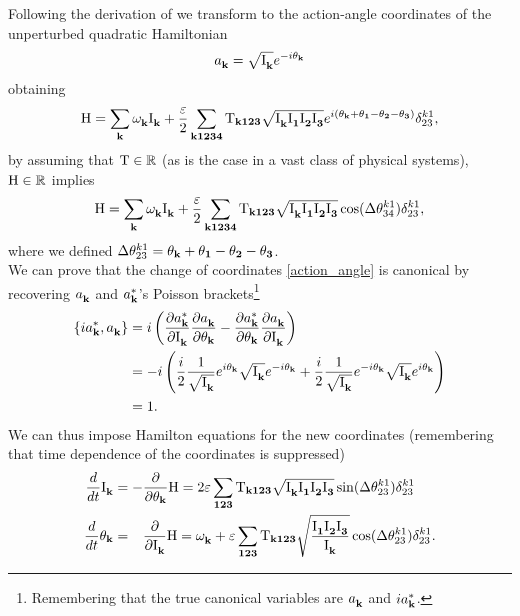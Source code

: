 Following the derivation of \cite{Onorato2020} we transform to the action-angle coordinates of the unperturbed quadratic Hamiltonian
\begin{equation}
    a_\mathbf{k}^{} = \sqrt{\mathrm{I}^{}_\mathbf{k}}e^{-i\theta_\mathbf{k}}
    \label{action_angle}
\end{equation} 
obtaining 
\begin{equation}
    \mathrm{H} = \sum_\mathbf{k} \omega^{}_{\mathbf{k}} \mathrm{I}^{}_\mathbf{k} + \frac{\varepsilon}{2} 
    \sum_{\mathbf{k1234}}\mathrm{T}_{\mathbf{k123}}\sqrt{\mathrm{I}^{}_\mathbf{k}\mathrm{I}^{}_\mathbf{1}\mathrm{I}^{}_\mathbf{2}\mathrm{I}^{}_\mathbf{3}}
    e^{i(\theta_\mathbf{k} + \theta_\mathbf{1} - \theta_\mathbf{2} - \theta_\mathbf{3})}\delta^{k1}_{23},
\end{equation}
by assuming that $\mathrm{T} \in \mathbb{R}$ (as is the case in a vast class of physical systems), $\mathrm{H} \in \mathbb{R}$ implies 
\begin{equation}
    \mathrm{H} = \sum_\mathbf{k} \omega^{}_{\mathbf{k}} \mathrm{I}^{}_\mathbf{k} + \frac{\varepsilon}{2} \sum_{\mathbf{k1234}}\mathrm{T}_{\mathbf{k123}}\sqrt{\mathrm{I}^{}_\mathbf{k}\mathrm{I}^{}_\mathbf{1}\mathrm{I}^{}_\mathbf{2}\mathrm{I}^{}_\mathbf{3}}\cos(\Delta\theta^{k1}_{34})\delta^{k1}_{23},
\end{equation}
where we defined $\Delta\theta^{k1}_{23}=\theta_\mathbf{k} + \theta_\mathbf{1} - \theta_\mathbf{2} - \theta_\mathbf{3}$. \\
We can prove that the change of coordinates \eqref{action_angle} is canonical by recovering $a_\mathbf{k}^{}$ and $a_\mathbf{k}^{*}$'s Poisson 
brackets\footnote{Remembering that the true canonical variables are $a_\mathbf{k}^{}$ and $ia_\mathbf{k}^{*}$.}
\begin{align}
    \left\{ ia_\mathbf{k}^{*}, a_\mathbf{k}^{} \right\} &= i \left( \frac{\partial a_\mathbf{k}^{*}}{\partial \mathrm{I}^{}_\mathbf{k}}\frac{\partial a_\mathbf{k}^{}}{\partial \theta_\mathbf{k}}  -
    \frac{\partial a_\mathbf{k}^{*}}{\partial \theta_\mathbf{k}}\frac{\partial a_\mathbf{k}^{}}{\partial \mathrm{I}^{}_\mathbf{k}}  \right) \\
    &= - i \left( \frac{i}{2} \frac{1}{\sqrt{\mathrm{I}^{}_\mathbf{k}}}e^{i\theta_\mathbf{k}}\sqrt{\mathrm{I}^{}_\mathbf{k}}e^{-i\theta_\mathbf{k}} + 
    \frac{i}{2} \frac{1}{\sqrt{\mathrm{I}^{}_\mathbf{k}}}e^{-i\theta_\mathbf{k}}\sqrt{\mathrm{I}^{}_\mathbf{k}}e^{i\theta_\mathbf{k}}\right) \\
    &= 1 .
\end{align} 
We can thus impose Hamilton equations for the new coordinates (remembering that time dependence of the coordinates is suppressed)
\begin{align}
    \frac{d}{dt}\mathrm{I}^{}_\mathbf{k} &= - \frac{\partial }{\partial \theta_\mathbf{k}}\mathrm{H} = 2 \varepsilon \sum_{\mathbf{123}} \mathrm{T}_{\mathbf{k123}} \sqrt{\mathrm{I}^{}_\mathbf{k}\mathrm{I}^{}_\mathbf{1}\mathrm{I}^{}_\mathbf{2}\mathrm{I}^{}_\mathbf{3}} \sin(\Delta\theta^{k1}_{23})\delta^{k1}_{23}
    \label{Hameq1}\\
    \frac{d}{dt}\theta_\mathbf{k} &= \phantom{-} \frac{\partial }{\partial \mathrm{I}^{}_\mathbf{k}}\mathrm{H} = \omega^{}_{\mathbf{k}} + 
    \varepsilon \sum_{\mathbf{123}} \mathrm{T}_{\mathbf{k123}} \sqrt{\frac{\mathrm{I}^{}_\mathbf{1}\mathrm{I}^{}_\mathbf{2}\mathrm{I}^{}_\mathbf{3}}{\mathrm{I}^{}_\mathbf{k}}}\cos(\Delta\theta^{k1}_{23})\delta^{k1}_{23}.
    \label{Hameq2}
\end{align}
